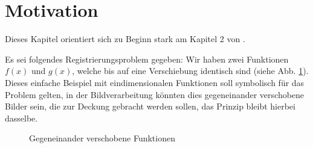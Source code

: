 %
%
%

\section{Motivation
\label{mellin:section:teil1}}

Dieses Kapitel orientiert sich zu Beginn stark am Kapitel 2 von
\cite{mellin:mendezmueller-book}.
\smallskip

Es sei folgendes Registrierungsproblem gegeben: Wir haben zwei 
Funktionen $f(x)$ und $g(x)$, welche bis auf eine Verschiebung 
identisch sind (siehe Abb. \ref{fig:mellin:f1}).
Dieses einfache Beispiel mit eindimensionalen Funktionen soll 
symbolisch für das Problem gelten, in der Bildverarbeitung könnten 
dies gegeneinander verschobene Bilder sein, die zur Deckung gebracht 
werden sollen, das Prinzip bleibt hierbei dasselbe.
\begin{figure}
    \centering
    \caption{Gegeneinander verschobene Funktionen
    \label{fig:mellin:f1}}
\end{figure}

